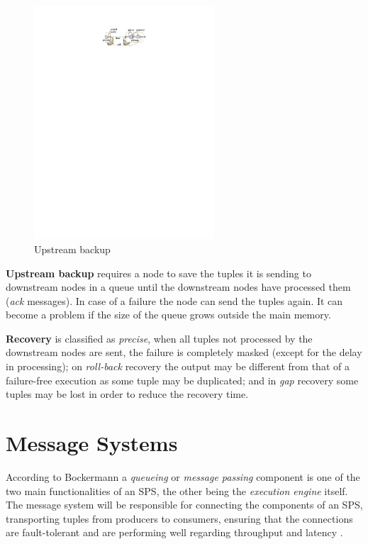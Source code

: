 \documentclass[ppgc,diss,english]{iiufrgs}
\begin{document}
\begin{figure}[!ht]
	\centering
	\includegraphics[width=0.6\textwidth]{images/fault_tolerance/upstream_backup.pdf}
	\caption[Upstream backup]{Upstream backup \cite{balazinska2009fault}}
	\label{fig:upstream_backup}
\end{figure}


\textbf{Upstream backup} requires a node to save the tuples it is sending to downstream nodes in a queue until the downstream nodes have processed them (\emph{ack} messages). In case of a failure the node can send the tuples again. It can become a problem if the size of the queue grows outside the main memory.

\textbf{Recovery} is classified as \emph{precise}, when all tuples not processed by the downstream nodes are sent, the failure is completely masked (except for the delay in processing); on \emph{roll-back} recovery the output may be different from that of a failure-free execution as some tuple may be duplicated; and in \emph{gap} recovery some tuples may be lost in order to reduce the recovery time.


\section{Message Systems}
\label{sec:esp:data_transport}

According to Bockermann \cite{bockermann2014survey} a \emph{queueing} or \emph{message passing} component is one of the two main functionalities of an SPS, the other being the \emph{execution engine} itself. The message system will be responsible for connecting the components of an SPS, transporting tuples from producers to consumers, ensuring that the connections are fault-tolerant and are performing well regarding throughput and latency \cite{andrade2014fundamentals}.
\end{document}
